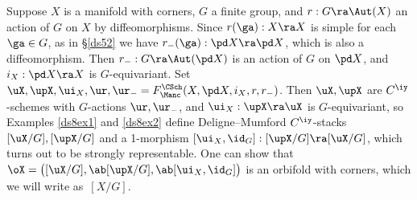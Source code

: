 \documentclass{article}
\begin{document}
\begin{ex} Suppose $X$ is a manifold with corners, $G$ a finite
group, and $r:G\ra\Aut(X)$ an action of $G$ on $X$ by
diffeomorphisms. Since $r(\ga):X\ra X$ is simple for each $\ga\in
G$, as in \S\ref{ds52} we have $r_-(\ga):\pd X\ra\pd X$, which is
also a diffeomorphism. Then $r_-:G\ra\Aut(\pd X)$ is an action of
$G$ on $\pd X$, and $i_X:\pd X\ra X$ is $G$-equivariant. Set
$\uX,\upX,\ui_X,\ur,\ur_-=F_\Manc^\CSch(X,\pd X,i_X,r,r_-)$. Then
$\uX,\upX$ are $C^\iy$-schemes with $G$-actions $\ur,\ur_-$, and
$\ui_X:\upX\ra\uX$ is $G$-equivariant, so Examples \ref{ds8ex1} and
\ref{ds8ex2} define Deligne--Mumford $C^\iy$-stacks $[\uX/G],
[\upX/G]$ and a 1-morphism $[\ui_X,\id_G]:[\upX/G]\ra[\uX/G]$, which
turns out to be strongly representable. One can show that
$\oX=\bigl([\uX/G],\ab [\upX/G],\ab[\ui_X,\id_G]\bigr)$ is an
orbifold with corners, which we will write as~$[X/G]$.
\label{ds12ex1}
\end{ex}
\end{document}
